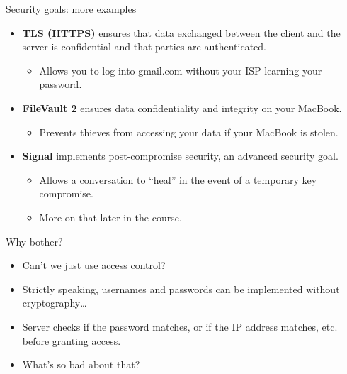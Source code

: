 \documentclass[aspectratio=169, lualatex, handout]{beamer}
\begin{document}
\begin{frame}{Security goals: more examples}
	\begin{itemize}[<+->]
		\item \textbf{TLS (HTTPS)} ensures that data exchanged between the client
		      and the server is confidential and that parties are authenticated.
		      \begin{itemize}
			      \item Allows you to log into gmail.com without your ISP learning your password.
		      \end{itemize}
		\item \textbf{FileVault 2} ensures data confidentiality and integrity on
		      your MacBook.
		      \begin{itemize}
			      \item Prevents thieves from accessing your data if your MacBook is stolen.
		      \end{itemize}
		\item \textbf{Signal} implements post-compromise security, an advanced security
		      goal.
		      \begin{itemize}
			      \item Allows a conversation to ``heal'' in the event of a temporary key
			            compromise.
			      \item More on that later in the course.
		      \end{itemize}
	\end{itemize}
\end{frame}

\begin{frame}{Why bother?}
	\begin{itemize}[<+->]
		\item Can't we just use access control?
		\item Strictly speaking, usernames and passwords can be implemented
		      without cryptography\ldots
		\item Server checks if the password matches, or if the IP address matches,
		      etc. before granting access.
		\item What's so bad about that?
	\end{itemize}
\end{frame}
\end{document}

